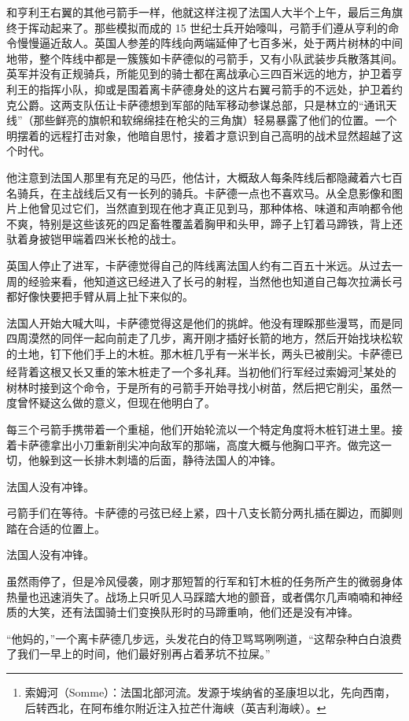 \documentclass[AutoFakeBold=true]{book}
\begin{document}
和亨利王右翼的其他弓箭手一样，他就这样注视了法国人大半个上午，最后三角旗终于挥动起来了。那些模拟而成的 15 世纪士兵开始嚎叫，弓箭手们遵从亨利的命令慢慢逼近敌人。英国人参差的阵线向两端延伸了七百多米，处于两片树林的中间地带，整个阵线中都是一簇簇如卡萨德似的弓箭手，又有小队武装步兵散落其间。英军并没有正规骑兵，所能见到的骑士都在离战承心三四百米远的地方，护卫着亨利王的指挥小队，抑或是围着离卡萨德身处的这片右翼弓箭手的不远处，护卫着约克公爵。这两支队伍让卡萨德想到军部的陆军移动参谋总部，只是林立的``通讯天线''（那些鲜亮的旗帜和软绵绵挂在枪尖的三角旗）轻易暴露了他们的位置。一个明摆着的远程打击对象，他暗自思忖，接着才意识到自己高明的战术显然超越了这个时代。

他注意到法国人那里有充足的马匹，他估计，大概敌人每条阵线后都隐藏着六七百名骑兵，在主战线后又有一长列的骑兵。卡萨德一点也不喜欢马。从全息影像和图片上他曾见过它们，当然直到现在他才真正见到马，那种体格、味道和声响都令他不爽，特别是这些该死的四足畜牲覆盖着胸甲和头甲，蹄子上钉着马蹄铁，背上还驮着身披铠甲端着四米长枪的战士。

英国人停止了进军，卡萨德觉得自己的阵线离法国人约有二百五十米远。从过去一周的经验来看，他知道这已经进入了长弓的射程，当然他也知道自己每次拉满长弓都好像快要把手臂从肩上扯下来似的。

法国人开始大喊大叫，卡萨德觉得这是他们的挑衅。他没有理睬那些漫骂，而是同四周漠然的同伴一起向前走了几步，离开刚才插好长箭的地方，然后开始找块松软的土地，钉下他们手上的木桩。那木桩几乎有一米半长，两头已被削尖。卡萨德已经背着这根又长又重的笨木桩走了一个多礼拜。当初他们行军经过索姆河\footnote{索姆河（Somme）：法国北部河流。发源于埃纳省的圣康坦以北，先向西南，后转西北，在阿布维尔附近注入拉芒什海峡（英吉利海峡）。}某处的树林时接到这个命令，于是所有的弓箭手开始寻找小树苗，然后把它削尖，虽然一度曾怀疑这么做的意义，但现在他明白了。

每三个弓箭手携带着一个重槌，他们开始轮流以一个特定角度将木桩钉进土里。接着卡萨德拿出小刀重新削尖冲向敌军的那端，高度大概与他胸口平齐。做完这一切，他躲到这一长排木刺墙的后面，静待法国人的冲锋。

法国人没有冲锋。

弓箭手们在等待。卡萨德的弓弦已经上紧，四十八支长箭分两扎插在脚边，而脚则踏在合适的位置上。

法国人没有冲锋。

虽然雨停了，但是冷风侵袭，刚才那短暂的行军和钉木桩的任务所产生的微弱身体热量也迅速消失了。战场上只听见人马踩踏大地的颤音，或者偶尔几声喃喃和神经质的大笑，还有法国骑士们变换队形时的马蹄重响，他们还是没有冲锋。

``他妈的，''一个离卡萨德几步远，头发花白的侍卫骂骂咧咧道，``这帮杂种白白浪费了我们一早上的时间，他们最好别再占着茅坑不拉屎。''
\end{document}
